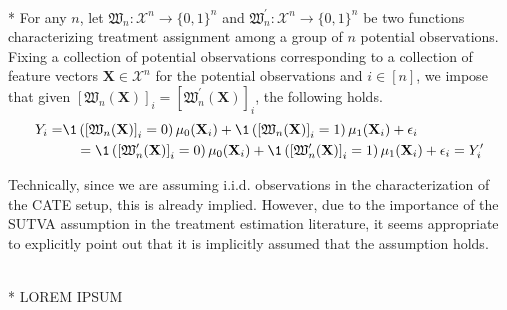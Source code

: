 \begin{boxD}
	\begin{asm}\label{asm:sutva}\mbox{}\\*
		For any $n$, let $\mathfrak{W}_{n}: \mathcal{X}^{n} \rightarrow \{0,1\}^{n}$ and $\mathfrak{W}_{n}^{\prime}: \mathcal{X}^{n} \rightarrow \{0,1\}^{n}$ be two functions characterizing treatment assignment among a group of $n$ potential observations.
		Fixing a collection of potential observations corresponding to a collection of feature vectors $\mathbf{X} \in  \mathcal{X}^{n}$ for the potential observations and $i \in [n]$, we impose that given $\left[\mathfrak{W}_{n}(\mathbf{X})\right]_{i} = \left[\mathfrak{W}_{n}^{\prime}(\mathbf{X})\right]_{i}$, the following holds.
		\begin{equation}
			\begin{aligned}
				Y_{i} = & \1\left(\left[\mathfrak{W}_{n}(\mathbf{X})\right]_{i} = 0\right)\mu_{0}(\mathbf{X}_i)
				+ \1\left(\left[\mathfrak{W}_{n}(\mathbf{X})\right]_{i} = 1\right)\mu_{1}(\mathbf{X}_i)
				+ \epsilon_i \\
				&\quad  = 
				\1\left(\left[\mathfrak{W}_{n}^{\prime}(\mathbf{X})\right]_{i} = 0\right)\mu_{0}(\mathbf{X}_i)
				+\1\left(\left[\mathfrak{W}_{n}^{\prime}(\mathbf{X})\right]_{i} = 1\right)\mu_{1}(\mathbf{X}_i)
				+ \epsilon_i
				= Y_{i}^{\prime}
			\end{aligned}
		\end{equation}
	\end{asm}
\end{boxD}
Technically, since we are assuming i.i.d. observations in the characterization of the CATE setup, this is already implied.
However, due to the importance of the SUTVA assumption in the treatment estimation literature, it seems appropriate to explicitly point out that it is implicitly assumed that the assumption holds.
\begin{boxE}
    \addtocounter{exmp}{-1}
    \begin{exmp}\mbox{}\\*
        {\color{red} LOREM IPSUM}
    \end{exmp}    
\end{boxE}
